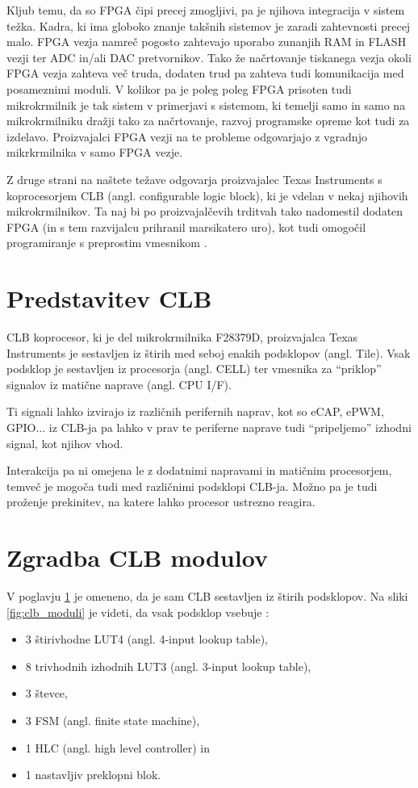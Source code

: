 \documentclass[a4paper]{article}
\begin{document}
\begin{sloppypar}
Kljub temu, da so FPGA čipi precej zmogljivi, pa je njihova integracija v
sistem težka.  Kadra, ki ima globoko znanje takšnih sistemov je zaradi
zahtevnosti precej malo. FPGA vezja namreč pogosto zahtevajo uporabo zunanjih
RAM in FLASH vezji ter ADC in/ali DAC pretvornikov. Tako že načrtovanje
tiskanega vezja okoli FPGA vezja zahteva več truda, dodaten trud pa zahteva
tudi komunikacija med posameznimi moduli. V kolikor pa je poleg poleg FPGA
prisoten tudi mikrokrmilnik je tak sistem v primerjavi s sistemom, ki temelji
samo in samo na mikrokrmilniku dražji tako za načrtovanje, razvoj programske
opreme kot tudi za izdelavo. Proizvajalci FPGA vezji na te probleme odgovarjajo
z vgradnjo mikrkrmilnika v samo FPGA vezje.

Z druge strani na naštete težave odgovarja proizvajalec Texas Instruments s
koprocesorjem CLB (angl. configurable logic block), ki je vdelan v nekaj
njihovih mikrokrmilnikov. Ta naj bi po proizvajalčevih trditvah tako nadomestil
dodaten FPGA (in s tem razvijalcu prihranil marsikatero uro), kot tudi omogočil
programiranje s preprostim vmesnikom \cite{clb-intro}.


\section{Predstavitev CLB}\label{sec:predstavitev}
CLB koprocesor, ki je del mikrokrmilnika F28379D, proizvajalca Texas
Instruments je sestavljen iz štirih med seboj enakih podsklopov (angl. Tile).
Vsak podsklop je sestavljen iz procesorja (angl. CELL) ter vmesnika za
``priklop'' signalov iz matične naprave (angl. CPU I/F).

Ti signali lahko izvirajo iz različnih perifernih naprav, kot so eCAP, ePWM,
GPIO... iz CLB-ja pa lahko v prav te periferne naprave tudi ``pripeljemo''
izhodni signal, kot njihov vhod.

Interakcija pa ni omejena le z dodatnimi napravami in matičnim procesorjem,
temveč je mogoča tudi med različnimi podsklopi CLB-ja. Možno pa je tudi
proženje prekinitev, na katere lahko procesor ustrezno reagira.

\section{Zgradba CLB modulov}\label{sec:zgradbaclb}
V poglavju \ref{sec:predstavitev} je omeneno, da je sam CLB sestavljen iz
štirih podsklopov. Na sliki \ref{fig:clb_moduli} je videti, da vsak podsklop
vsebuje \cite[Pogl.~26.4]{mcu-ref-manual}:
\begin{itemize}
    \item 3 štirivhodne LUT4 (angl. 4-input lookup table),
    \item 8 trivhodnih izhodnih LUT3 (angl. 3-input lookup table),
    \item 3 števce,
    \item 3 FSM (angl. finite state machine),
    \item 1 HLC (angl. high level controller) in
    \item 1 nastavljiv preklopni blok.
\end{itemize}


\end{sloppypar}
\end{document}
